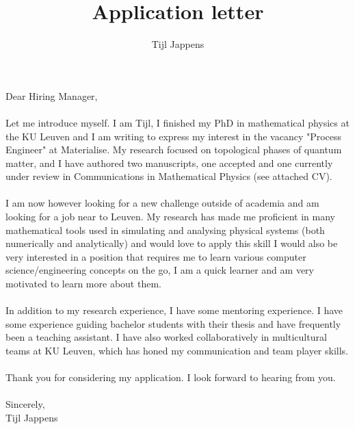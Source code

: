 \documentclass[11pt]{article}
\title{Application letter}
\author{Tijl Jappens}
\begin{document}
\maketitle
Dear Hiring Manager,\\\\
Let me introduce myself. I am Tijl, I finished my PhD in mathematical physics at the KU Leuven and I am writing to express my interest in the vacancy "Process Engineer" at Materialise. My research focused on topological phases of quantum matter, and I have authored two manuscripts, one accepted and one currently under review in Communications in Mathematical Physics (see attached CV).\\\\
I am now however looking for a new challenge outside of academia and am looking for a job near to Leuven. My research has made me proficient in many mathematical tools used in simulating and analysing physical systems (both numerically and analytically) and would love to apply this skill I would also be very interested in a position that requires me to learn various computer science/engineering concepts on the go, I am a quick learner and am very motivated to learn more about them.\\\\
In addition to my research experience, I have some mentoring experience. I have some experience guiding bachelor students with their thesis and have frequently been a teaching assistant. I have also worked collaboratively in multicultural teams at KU Leuven, which has honed my communication and team player skills.
\\\\
Thank you for considering my application. I look forward to hearing from you.\\\\
Sincerely,\\
Tijl Jappens
\end{document}
